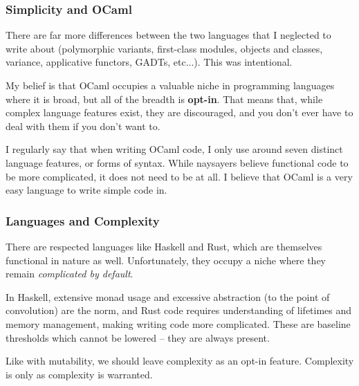 \documentclass[aspectratio=169, handout]{beamer}
\begin{document}
\begin{frame}[fragile]
  \frametitle{Simplicity and OCaml}

  There are far more differences between the two languages that I neglected to
  write about (polymorphic variants, first-class modules, objects and classes,
  variance, applicative functors, GADTs, etc...). This was intentional.

  \vspace{\fill}

  My belief is that OCaml occupies a valuable niche in programming languages
  where it is broad, but all of the breadth is \textbf{opt-in}. That means that,
  while complex language features exist, they are discouraged, and you don't
  ever have to deal with them if you don't want to.

  \vspace{\fill}

  I regularly say that when writing OCaml code, I only use around seven distinct
  language features, or forms of syntax. While naysayers believe functional code to
  be more complicated, it does not need to be at all. I believe that OCaml is
  a very easy language to write simple code in.
\end{frame}

\begin{frame}[fragile]
  \frametitle{Languages and Complexity}

  There are respected languages like Haskell and Rust, which are themselves
  functional in nature as well. Unfortunately, they occupy a niche where they
  remain \textit{complicated by default}.

  \vspace{\fill}

  In Haskell, extensive monad usage and excessive abstraction (to the point of
  convolution) are the norm, and Rust code requires understanding of lifetimes
  and memory management, making writing code more complicated. These are baseline
  thresholds which cannot be lowered -- they are always present.

  \vspace{\fill}

  Like with mutability, we should leave complexity as an opt-in feature. Complexity
  is only as complexity is warranted.
\end{frame}
\end{document}
